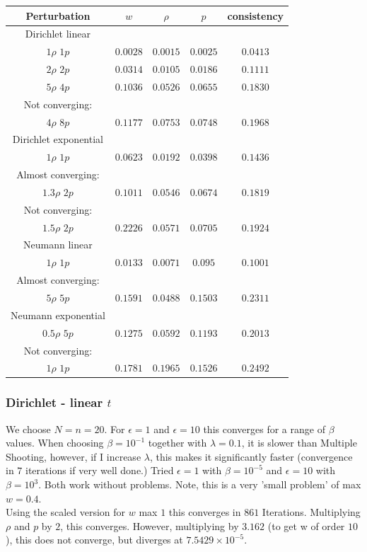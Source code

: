 \documentclass[11pt, a4paper]{article}
\theoremstyle{definition}
\begin{document}
\begin{center}
	\begin{tabular}{ |c| c |c |c | c|}
		\hline
		Perturbation & $w$ & $\rho$ & $p$ & consistency \\ 
		\hline
		Dirichlet linear &&&&\\
		 $1\rho$ $1p$ & $0.0028$ & $0.0015$ & $0.0025$ & $0.0413$ \\  
         $2\rho$ $2p$ & $0.0314$ & $0.0105$ & $0.0186$ & $0.1111$ \\  
         $5\rho$ $4p$ & $0.1036$ & $0.0526$ & $0.0655$ & $0.1830$ \\
         Not converging: &&&&\\  
         $4\rho$ $8p$ & $0.1177$ & $0.0753$ & $0.0748$ & $0.1968$ \\  
         \hline
         Dirichlet exponential &&&&\\
         $1\rho$ $1p$ & $0.0623$ & $0.0192$ & $0.0398$ & $0.1436$ \\  
         Almost converging: &&&&\\
         $1.3\rho$ $2p$ & $0.1011$ & $0.0546$ & $0.0674$ & $0.1819$ \\  
         Not converging: &&&&\\  
         $1.5\rho$ $2p$ & $0.2226$ & $0.0571$ & $0.0705$ & $0.1924$ \\ 
         \hline
         Neumann linear &&&&\\
         $1\rho$ $1p$ & $0.0133$ & $0.0071$ & $0.095$ & $0.1001$ \\  
         Almost converging: &&&&\\
         $5\rho$ $5p$ & $0.1591$ & $0.0488$ & $0.1503$ & $0.2311$ \\
         \hline
         Neumann exponential &&&&\\
         $0.5\rho$ $5p$ & $0.1275$ & $0.0592$ & $0.1193$ & $0.2013$ \\     
         Not converging: &&&&\\
         $1\rho$ $1p$ & $0.1781$ & $0.1965$ & $0.1526$ & $0.2492$ \\  
	     \hline
	\end{tabular}
\end{center}




\subsubsection{Dirichlet - linear $t$}
We choose $N=n=20$.
For $\epsilon = 1$ and $\epsilon =10$ this converges for a range of $\beta$ values. When choosing $\beta = 10^{-1}$ together with $\lambda =0.1$, it is slower than Multiple Shooting, however, if I increase $\lambda$, this makes it significantly faster (convergence in $7$ iterations if very well done.)
Tried $\epsilon =1$ with $\beta = 10^{-5}$ and $\epsilon=10$ with $\beta =10^3$. Both work without problems. Note, this is a very 'small problem' of max $w = 0.4$.\\
Using the scaled version for $w$ max $1$ this converges in $861$ Iterations. Multiplying $\rho$ and $p$ by $2$, this converges. However, multiplying by $3.162$ (to get w of order $10$), this does not converge, but diverges at $7.5429 \times 10^{-5}$.
\end{document}
